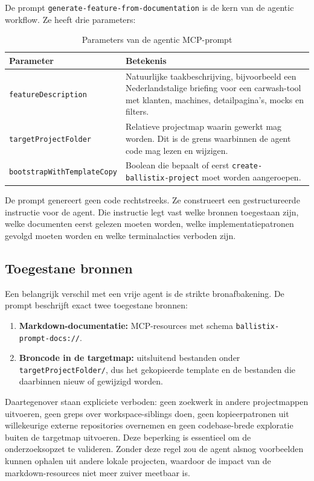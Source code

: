 De prompt \texttt{generate-feature-from-documentation} is de kern van de agentic workflow. Ze heeft drie parameters:

\begin{table}[htbp]
  \centering
  \caption{Parameters van de agentic MCP-prompt}
  \label{tab:poc-agentic-prompt-params}
  \small
  \begin{tabularx}{\textwidth}{|l|X|}
    \hline
    \textbf{Parameter} & \textbf{Betekenis} \\
    \hline
    \texttt{featureDescription} &
    Natuurlijke taakbeschrijving, bijvoorbeeld een Nederlandstalige briefing voor een carwash-tool met klanten, machines, detailpagina's, mocks en filters. \\
    \hline
    \texttt{targetProjectFolder} &
    Relatieve projectmap waarin gewerkt mag worden. Dit is de grens waarbinnen de agent code mag lezen en wijzigen. \\
    \hline
    \texttt{bootstrapWithTemplateCopy} &
    Boolean die bepaalt of eerst \texttt{create-ballistix-project} moet worden aangeroepen. \\
    \hline
  \end{tabularx}
\end{table}

De prompt genereert geen code rechtstreeks. Ze construeert een gestructureerde instructie voor de agent. Die instructie legt vast welke bronnen toegestaan zijn, welke documenten eerst gelezen moeten worden, welke implementatiepatronen gevolgd moeten worden en welke terminalacties verboden zijn.

\subsection{Toegestane bronnen}

Een belangrijk verschil met een vrije agent is de strikte bronafbakening. De prompt beschrijft exact twee toegestane bronnen:

\begin{enumerate}
  \item \textbf{Markdown-documentatie:} MCP-resources met schema \texttt{ballistix-prompt-docs://}.
  \item \textbf{Broncode in de targetmap:} uitsluitend bestanden onder \texttt{targetProjectFolder/}, dus het gekopieerde template en de bestanden die daarbinnen nieuw of gewijzigd worden.
\end{enumerate}

Daartegenover staan expliciete verboden: geen zoekwerk in andere projectmappen uitvoeren, geen greps over workspace-siblings doen, geen kopieerpatronen uit willekeurige externe repositories overnemen en geen codebase-brede exploratie buiten de targetmap uitvoeren. Deze beperking is essentieel om de onderzoeksopzet te valideren. Zonder deze regel zou de agent alsnog voorbeelden kunnen ophalen uit andere lokale projecten, waardoor de impact van de markdown-resources niet meer zuiver meetbaar is.


